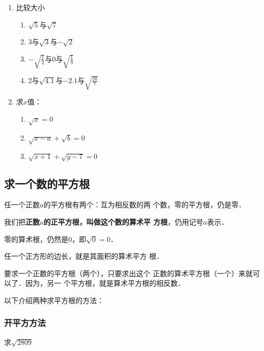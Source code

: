 \begin{ex}
\begin{enumerate}
    \item 比较大小
    \begin{multicols}{2}
\begin{enumerate}
    \item $\sqrt{5}$与$\sqrt{7}$
    \item 3与$\sqrt{3}$与$-\sqrt{2}$
    \item $-\sqrt{\frac{1}{2}}$与0与$\sqrt{\frac{1}{9}}$
    \item 2与$\sqrt{4.1}$与$-2.1$与$\sqrt{\frac{20}{7}}$
\end{enumerate}
    \end{multicols}

    \item 求$x$值：
\begin{enumerate}
    \item $\sqrt{x}=0$
    \item $\sqrt{x-a}+\sqrt{b}=0$
    \item $\sqrt{x+1}+\sqrt{y-7}=0$
\end{enumerate}
\end{enumerate}
    
\end{ex}

\subsection{求一个数的平方根}
任一个正数$a$的平方根有两个：互为相反数的两
个数，零的平方根，仍是零．

我们把\textbf{正数$a$的正平方根，叫做这个数的算术平
方根}，仍用记号$a$表示．

零的算术根，仍然是0，即$\sqrt{0}=0$．

任一个正方形的边长，就是其面积的算术平方
根．

要求一个正数的平方根（两个），只要求出这个
正数的算术平方根（一个）来就可以了．因为，另一
个平方根，就是算术平方根的相反数．

以下介绍两种求平方根的方法：

\subsubsection{开平方方法}
\begin{example}
    求$\sqrt{2809}$
\end{example}

